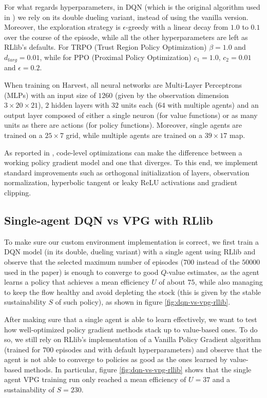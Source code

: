 \documentclass{article}
\begin{document}
For what regards hyperparameters, in DQN (which is the original algorithm used in \cite{harvest}) we rely on its double dueling variant, instead of using the vanilla version. Moreover, the exploration strategy is $\epsilon$-greedy with a linear decay from $1.0$ to $0.1$ over the course of the episode, while all the other hyperparameters are left as RLlib's defaults. For TRPO (Trust Region Policy Optimization) $\beta=1.0$ and $d_{targ}=0.01$, while for PPO (Proximal Policy Optimization) $c_1=1.0$, $c_2=0.01$ and $\epsilon=0.2$.

When training on Harvest, all neural networks are Multi-Layer Perceptrons (MLPs) with an input size of $1260$ (given by the observation dimension $3\times20\times21$), $2$ hidden layers with $32$ units each ($64$ with multiple agents) and an output layer composed of either a single neuron (for value functions) or as many units as there are actions (for policy functions). Moreover, single agents are trained on a $25\times7$ grid, while multiple agents are trained on a $39\times17$ map.

As reported in \cite{drl-that-matters,implementation-matters}, code-level optimizations can make the difference between a working policy gradient model and one that diverges. To this end, we implement standard improvements such as orthogonal initialization of layers, observation normalization, hyperbolic tangent or leaky ReLU activations and gradient clipping.

\subsection{Single-agent DQN vs VPG with RLlib}
To make sure our custom environment implementation is correct, we first train a DQN model (in its double, dueling variant) with a single agent using RLlib and observe that the selected maximum number of episodes ($700$ instead of the $50000$ used in the paper) is enough to converge to good $Q$-value estimates, as the agent learns a policy that achieves a mean efficiency $U$ of about $75$, while also managing to keep the flow healthy and avoid depleting the stock (this is given by the stable sustainability $S$ of such policy), as shown in figure \ref{fig:dqn-vs-vpg-rllib}.

After making sure that a single agent is able to learn effectively, we want to test how well-optimized policy gradient methods stack up to value-based ones. To do so, we still rely on RLlib's implementation of a Vanilla Policy Gradient algorithm (trained for $700$ episodes and with default hyperparameters) and observe that the agent is not able to converge to policies as good as the ones learned by value-based methods. In particular, figure \ref{fig:dqn-vs-vpg-rllib} shows that the single agent VPG training run only reached a mean efficiency of $U=37$ and a sustainability of $S=230$. 
\end{document}

